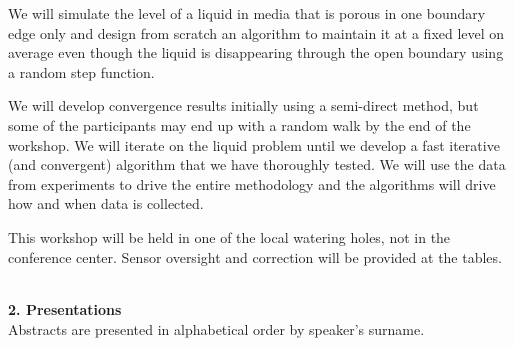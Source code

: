 \documentclass[twosided]{report}
\begin{document}
We will simulate the level of a liquid in media that is
porous in one boundary edge only and design from scratch an
algorithm to maintain it at a fixed level on average even
though the liquid is disappearing through the open boundary
using a random step function.

We will develop convergence results initially using a
semi-direct method, but some of the participants may end up
with a random walk by the end of the workshop. We will
iterate on the liquid problem until we develop a fast
iterative (and convergent) algorithm that we have thoroughly
tested. We will use the data from experiments to drive the
entire methodology and the algorithms will drive how and
when data is collected.

This workshop will be held in one of the local watering
holes, not in the conference center. Sensor oversight and
correction will be provided at the tables.


\newpage
	${}^{}$\par	%
	\begin{center} {\LARGE
		{\bf 2. Presentations}} \\
		Abstracts are presented in alphabetical order by
		speaker's surname.
	\end{center}
\end{document}
